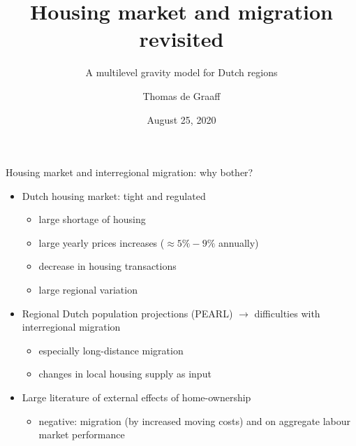 \documentclass{beamer}
\title{Housing market and migration revisited}
\subtitle{A multilevel gravity model for Dutch regions}
\date{August 25, 2020}
\author{Thomas de Graaff}
\institute{Vrije Universiteit Amsterdam\\Tinbergen Institute Amsterdam}
\begin{document}
\maketitle


\begin{frame}{Housing market and interregional migration: why bother?}
   	\begin{itemize}
   		\item Dutch housing market: tight and regulated
   		\begin{itemize}
   			\item large \alert{shortage} of housing
   			\item large yearly prices \alert{increases} ($\approx 5\%-9\%$ annually)
   			\item decrease in housing \alert{transactions}
   			\item large \alert{regional} variation\newline \pause
   		\end{itemize}
            \item Regional Dutch population projections (PEARL)  $\longrightarrow$ difficulties with \alert{interregional} migration
            \begin{itemize}
            \item especially long-distance migration  
            \item changes in local housing supply as input \newline \pause
            \end{itemize}
   		\item Large literature of \alert{external} effects of home-ownership \footnotesize{\citep{dietz2003social}}
   		\begin{itemize}
   			\item \alert{negative}: migration (by increased moving costs) and on aggregate labour market performance \footnotesize{\citep{oswald1996conjecture,oswald1999housing}}
   		\end{itemize}
   	\end{itemize}
\end{frame}
\end{document}
